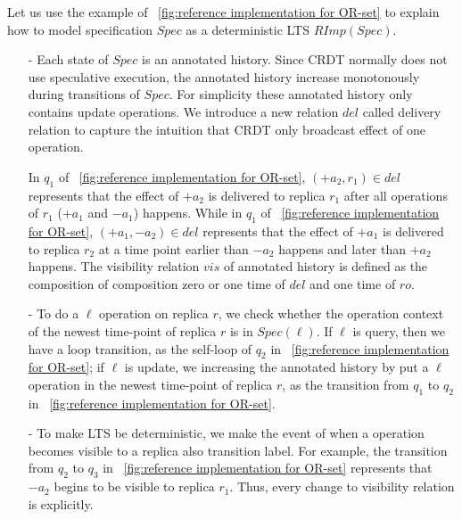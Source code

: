 {\color {red}Let us use the example of \figurename~\ref{fig:reference implementation for OR-set} to explain how to model specification $\mathit{Spec}$ as a deterministic LTS $\mathit{RImp}(\mathit{Spec})$. 

\begin{itemize}
\setlength{\itemsep}{0.5pt}
\item[-] Each state of $\mathit{Spec}$ is an annotated history. Since CRDT normally does not use speculative execution, the annotated history increase monotonously during transitions of $\mathit{Spec}$. For simplicity these annotated history only contains update operations. We introduce a new relation $\mathit{del}$ called delivery relation to capture the intuition that CRDT only broadcast effect of one operation.
    
    In $q_1$ of \figurename~\ref{fig:reference implementation for OR-set}, $(+a_2,r_1) \in \mathit{del}$ represents that the effect of $+a_2$ is delivered to replica $r_1$ after all operations of $r_1$ ($+a_1$ and $-a_1$) happens. While in $q_1$ of \figurename~\ref{fig:reference implementation for OR-set}, $(+a_1,-a_2) \in \mathit{del}$ represents that the effect of $+a_1$ is delivered to replica $r_2$ at a time point earlier than $-a_2$ happens and later than $+a_2$ happens. The visibility relation $\mathit{vis}$ of annotated history is defined as the composition of composition zero or one time of $\mathit{del}$ and one time of $\mathit{ro}$.

\item[-] To do a $\ell$ operation on replica $r$, we check whether the operation context of the newest time-point of replica $r$ is in $\mathit{Spec}(\ell)$. If $\ell$ is query, then we have a loop transition, as the self-loop of $q_2$ in \figurename~\ref{fig:reference implementation for OR-set}; if $\ell$ is update, we increasing the annotated history by put a $\ell$ operation in the newest time-point of replica $r$, as the transition from $q_1$ to $q_2$ in \figurename~\ref{fig:reference implementation for OR-set}. 

\item[-] To make LTS be deterministic, we make the event of when a operation becomes visible to a replica also transition label. For example, the transition from $q_2$ to $q_3$ in \figurename~\ref{fig:reference implementation for OR-set} represents that $-a_2$ begins to be visible to replica $r_1$. Thus, every change to visibility relation is explicitly. 
\end{itemize} }

